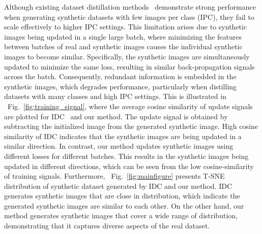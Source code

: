 \documentclass{article}
\theoremstyle{plain}
\theoremstyle{definition}
\theoremstyle{remark}
\begin{document}
Although existing dataset distillation methods~\cite{} demonstrate strong performance when generating synthetic datasets with few images per class (IPC), they fail to scale effectively to higher IPC settings. This limitation arises due to synthetic images being updated in a single large batch, where minimizing the features between batches of real and synthetic images causes the individual synthetic images to become similar. Specifically, the synthetic images are simultaneously updated to minimize the same loss, resulting in similar back-propagation signals across the batch. Consequently, redundant information is embedded in the synthetic images, which degrades performance, particularly when distilling datasets with many classes and high IPC settings. This is illustrated in ~Fig.~\ref{fig:training_signal}, where the average cosine similarity of update signals are plotted for IDC~\cite{} and our method. The update signal is obtained by subtracting the initialized image from the generated synthetic image. High cosine similarity of IDC indicates that the synthetic images are being updated in a similar direction. In contrast, our method updates synthetic images using different losses for different batches. This results in the synthetic images being updated in different directions, which can be seen from the low cosine-similarity of training signals. Furthermore, ~Fig.~\ref{fig:mainfigure} presents T-SNE~\cite{} distribution of synthetic dataset generated by IDC and our method. IDC generates synthetic images that are close in distribution, which indicate the generated synthetic images are similar to each other. On the other hand, our method generates synthetic images that cover a wide range of distribution, demonstrating that it captures diverse aspects of the real dataset.

\end{document}
